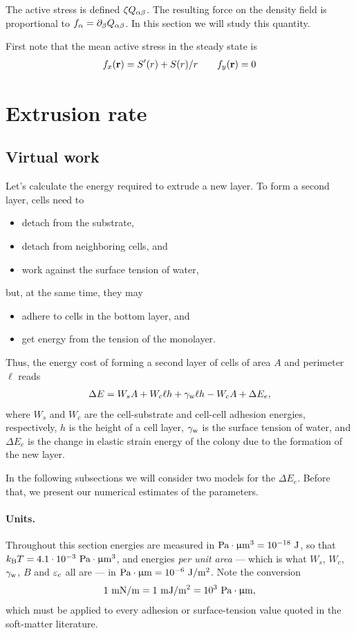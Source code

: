 \documentclass[a5paper]{article}
\begin{document}
The active stress is defined $\zeta Q_{\alpha\beta}$. The resulting force on the density field is proportional to $f_\alpha = \partial_\beta Q_{\alpha\beta}$. In this section we will study this quantity.

First note that the mean active stress in the steady state is 
\begin{align}
    f_x(\mathbf{r}) = S'(r) + S(r)/r
    \qquad
    f_y(\mathbf{r}) = 0
\end{align}


\section{Extrusion rate}
\label{sec-extrusion}

\subsection{Virtual work}

Let's calculate the energy required to extrude a new layer. To form a second layer, cells need to
\begin{itemize}
    \item detach from the substrate,
    \item detach from neighboring cells, and
    \item work against the surface tension of water,
\end{itemize}
but, at the same time, they may
\begin{itemize}
    \item adhere to cells in the bottom layer, and
    \item get energy from the tension of the monolayer.
\end{itemize}
Thus, the energy cost of forming a second layer of cells of area $A$ and perimeter $\ell$ reads
\begin{align}
    \label{eq:virtual-work}
    \Delta E=W_s A+W_c \ell h+\gamma_{\rm w} \ell h-W_c A+\Delta E_e,
\end{align}
where $W_s$ and $W_c$ are the cell-substrate and cell-cell adhesion energies, respectively, $h$ is the height of a cell layer, $\gamma_{\rm w}$ is the surface tension of water, and $\Delta E_e$ is the change in elastic strain energy of the colony due to the formation of the new layer.

In the following subsections we will consider two models for the $\Delta E_e$. Before that, we present our numerical estimates of the parameters.

\paragraph{Units.} Throughout this section energies are measured in $\text{Pa}\cdot\upmu\mathrm{m}^3 = 10^{-18}~\mathrm{J}$, so that $k_\mathrm{B} T = 4.1\cdot10^{-3}~\text{Pa}\cdot\upmu\mathrm{m}^3$, and energies \emph{per unit area} --- which is what $W_s$, $W_c$, $\gamma_{\rm w}$, $B$ and $\varepsilon_{\rm c}$ all are --- in $\text{Pa}\cdot\upmu\mathrm{m} = 10^{-6}~\mathrm{J/m^2}$. Note the conversion
\begin{align}
    1~\mathrm{mN/m} = 1~\mathrm{mJ/m^2} = 10^{3}~\text{Pa}\cdot\upmu\mathrm{m} ,
\end{align}
which must be applied to every adhesion or surface-tension value quoted in the soft-matter literature.
\end{document}
